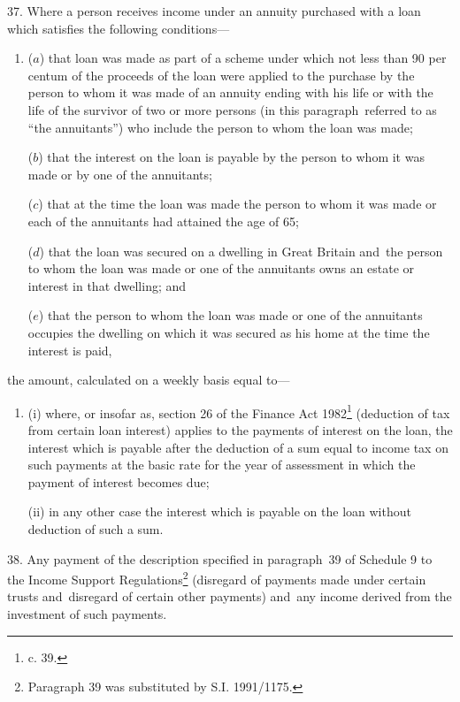\documentclass[12pt,a4paper]{article}
\begin{document}
37.  Where a person receives income under an annuity purchased with a loan which satisfies the following conditions—
\begin{enumerate}\item[]
($a$) that loan was made as part of a scheme under which not less than 90 per centum of the proceeds of the loan were applied to the purchase by the person to whom it was made of an annuity ending with his life or with the life of the survivor of two or more persons (in this paragraph~referred to as “the annuitants”) who include the person to whom the loan was made;

($b$) that the interest on the loan is payable by the person to whom it was made or by one of the annuitants;

($c$) that at the time the loan was made the person to whom it was made or each of the annuitants had attained the age of 65;

($d$) that the loan was secured on a dwelling in Great Britain and~the person to whom the loan was made or one of the annuitants owns an estate or interest in that dwelling; and

($e$) that the person to whom the loan was made or one of the annuitants occupies the dwelling on which it was secured as his home at the time the interest is paid,
\end{enumerate}
the amount, calculated on a weekly basis equal to—
\begin{enumerate}\item[]
(i) where, or insofar as, section 26 of the Finance Act 1982\footnote{ c. 39.} (deduction of tax from certain loan interest) applies to the payments of interest on the loan, the interest which is payable after the deduction of a sum equal to income tax on such payments at the basic rate for the year of assessment in which the payment of interest becomes due;

(ii) in any other case the interest which is payable on the loan without deduction of such a sum.
\end{enumerate}

\medskip

38.  Any payment of the description specified in paragraph~39 of Schedule 9 to the Income Support Regulations\footnote{\frenchspacing Paragraph 39 was substituted by S.I. 1991/1175.} (disregard of payments made under certain trusts and~disregard of certain other payments) and~any income derived from the investment of such payments.

\medskip
\end{document}
